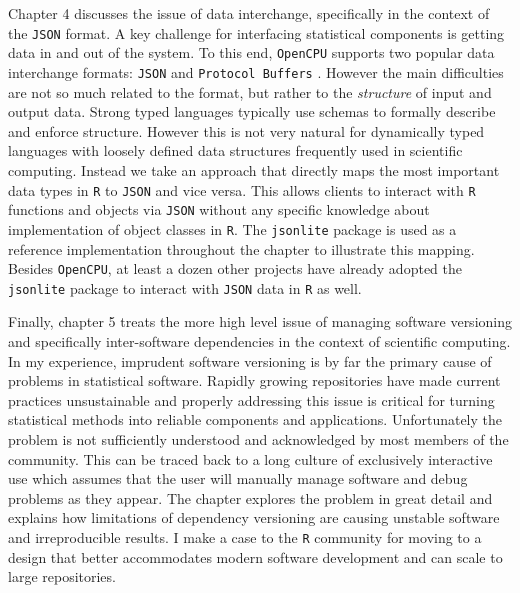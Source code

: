 Chapter 4 discusses the issue of data interchange, specifically in the context of the \texttt{JSON} format. A key challenge for interfacing statistical components is getting data in and out of the system. To this end, \texttt{OpenCPU} supports two popular data interchange formats: \texttt{JSON} and \texttt{Protocol Buffers} \citep{rprotobuf}. However the main difficulties are not so much related to the format, but rather to the \emph{structure} of input and output data. Strong typed languages typically use schemas to formally describe and enforce structure. However this is not very natural for dynamically typed languages with loosely defined data structures frequently used in scientific computing. Instead we take an approach that directly maps the most important data types in \texttt{R} to \texttt{JSON} and vice versa. This allows clients to interact with \texttt{R} functions and objects via \texttt{JSON} without any specific knowledge about implementation of object classes in \texttt{R}. The \texttt{jsonlite} package is used as a reference implementation throughout the chapter to illustrate this mapping. Besides \texttt{OpenCPU}, at least a dozen other projects have already adopted the \texttt{jsonlite} package to interact with \texttt{JSON} data in \texttt{R} as well.

Finally, chapter 5 treats the more high level issue of managing software versioning and specifically inter-software dependencies in the context of scientific computing. In my experience, imprudent software versioning is by far the primary cause of problems in statistical software. Rapidly growing repositories have made current practices unsustainable and properly addressing this issue is critical for turning statistical methods into reliable components and applications. Unfortunately the problem is not sufficiently understood and acknowledged by most members of the community. This can be traced back to a long culture of exclusively interactive use which assumes that the user will manually manage software and debug problems as they appear. The chapter explores the problem in great detail and explains how limitations of dependency versioning are causing unstable software and irreproducible results. I make a case to the \texttt{R} community for moving to a design that better accommodates modern software development and can scale to large repositories.  


